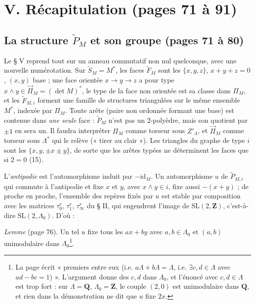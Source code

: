 \documentclass[11pt,a4paper]{article}
\begin{document}
\section*{V. Récapitulation (pages 71 à 91)}

\subsection*{La structure $\widetilde{P}_M$ et son groupe (pages 71 à 80)}

Le § V reprend tout sur un anneau commutatif non nul quelconque, avec une
nouvelle numérotation. Sur $\widetilde{S}_M = M^{*}$, les faces
$\widetilde{F}_M$ sont les $\{x, y, z\}$, $x + y + z = 0$, $(x, y)$ base ; une
face orientée $x \to y \to z$ a pour type $x \wedge y \in
\overrightarrow{\Pi}_M = (\det M)^{*}$, le type de la face non orientée est sa
classe dans $\Pi_M$, et les $\widetilde{F}_{M,i}$ forment une famille de
structures triangulées sur le même ensemble $M^{*}$, indexée par $\Pi_M$. Toute
arête (paire non ordonnée formant une base) est contenue dans \emph{une seule}
face : $\widetilde{P}_M$ n'est pas un 2-polyèdre, mais son quotient par $\pm 1$
en sera un. Il faudra interpréter $\Pi_M$ comme torseur sous $Z'_\Lambda$, et
$\overrightarrow{\Pi}_M$ comme torseur sous $\Lambda^{*}$ qui le relève (« tirer
au clair »). Les triangles du graphe de type $i$ sont les $\{x, y, \pm x \pm
y\}$, de sorte que les arêtes typées ne déterminent les faces que si $2 = 0$
(15).

L'\emph{antipodie} est l'automorphisme induit par $-\mathrm{id}_M$. Un
automorphisme $u$ de $\widetilde{P}_{M,i}$ qui commute à l'antipodie et fixe
$x$ et $y$, avec $x \wedge y \in i$, fixe aussi $-(x+y)$ ; de proche en proche,
l'ensemble des repères fixés par $u$ est stable par composition avec les
matrices $\tau_0^r$, $\tau_1^r$, $\tau_\infty^r$ du § II, qui engendrent
l'image de $\mathrm{SL}(2, \mathbf{Z})$, c'est-à-dire $\mathrm{SL}(2,
\Lambda_0)$. D'où :

\emph{Lemme} (page 76). Un tel $u$ fixe tous les $ax + by$ avec $a, b \in
\Lambda_0$ et $(a, b)$ unimodulaire dans $\Lambda_0$\footnote{La page écrit
« premiers entre eux (i.e. $a\Lambda + b\Lambda = \Lambda$, i.e. $\exists c, d
\in \Lambda$ avec $ad - bc = 1$) ». L'argument donne des $c, d$ dans
$\Lambda_0$, et l'énoncé avec $c, d \in \Lambda$ est trop fort : sur $\Lambda =
\mathbf{Q}$, $\Lambda_0 = \mathbf{Z}$, le couple $(2, 0)$ est unimodulaire
dans $\mathbf{Q}$, et rien dans la démonstration ne dit que $u$ fixe $2x$.}.
\end{document}
